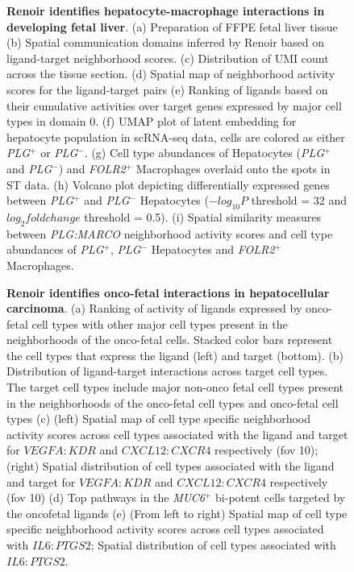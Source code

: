 \begin{figure}[H]
    \centering
    \caption{\textbf{Renoir identifies hepatocyte-macrophage interactions in developing fetal liver}. (a) Preparation of FFPE fetal liver tissue (b) Spatial communication domains inferred by Renoir based on ligand-target neighborhood scores. (c) Distribution of UMI count across the tissue section. (d) Spatial map of neighborhood activity scores for the ligand-target pairs (e) Ranking of ligands based on their cumulative activities over target genes expressed by major cell types in domain 0. (f) UMAP plot of latent embedding for hepatocyte population in scRNA-seq data, cells are colored as either \textit{PLG}$^+$ or \textit{PLG}$^-$. (g) Cell type abundances of Hepatocytes (\textit{PLG}$^+$ and \textit{PLG}$^-$) and \textit{FOLR2}$^+$ Macrophages overlaid onto the spots in ST data. (h) Volcano plot depicting differentially expressed genes between \textit{PLG}$^+$ and \textit{PLG}$^-$ Hepatocytes ($-log_{10}P$ threshold = 32 and $log_2fold change$ threshold = 0.5). (i) Spatial similarity measures between \textit{PLG:MARCO} neighborhood activity scores and cell type abundances of \textit{PLG}$^+$, \textit{PLG}$^-$ Hepatocytes and \textit{FOLR2}$^+$ Macrophages.}
\label{Fig FL}
\end{figure}

\begin{figure}[H]
    \centering
    \caption{\textbf{Renoir identifies onco-fetal interactions in hepatocellular carcinoma}. (a) Ranking of activity of ligands expressed by onco-fetal cell types with other major cell types present in the neighborhoods of the onco-fetal cells. Stacked color bars represent the cell types that express the ligand (left) and target (bottom). (b) Distribution of ligand-target interactions across target cell types. The target cell types include major non-onco fetal cell types present in the neighborhoods of the onco-fetal cell types and onco-fetal cell types (c) (left) Spatial map of cell type specific neighborhood activity scores across cell types associated with the ligand and target for $VEGFA:KDR$ and $CXCL12:CXCR4$ respectively (fov 10); (right) Spatial distribution of cell types associated with the ligand and target for $VEGFA:KDR$ and $CXCL12:CXCR4$ respectively (fov 10) (d) Top pathways in the \textit{MUC6}$^{+}$ bi-potent cells targeted by the oncofetal ligands (e) (From left to right) Spatial map of cell type specific neighborhood activity scores across cell types associated with $IL6:PTGS2$; Spatial distribution of cell types associated with $IL6:PTGS2$.}
\label{Fig HCC}
\end{figure}


